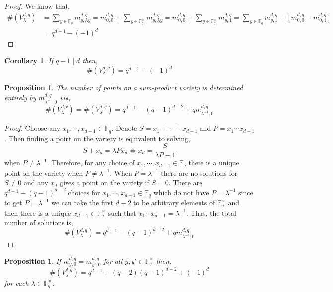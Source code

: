 \documentclass{article}
\newcommand{\finfield}[1]{\mathbb{F}_{#1}}
\newcommand{\finunits}[1]{\mathbb{F}_{#1}^\times}
\newcommand{\divides}{\mid}
\newtheorem{corollary}{Corollary}[theorem]
\newtheorem{proposition}[theorem]{Proposition}
\theoremstyle{definition}
\theoremstyle{definition}
\theoremstyle{remark}
\begin{document}
\begin{proof}
We know that,
\begin{align*}
\#(V^{d,q}_{\lambda}) & = \sum_{y \in \finfield{q}} m^{d,q}_{y, \lambda y} = m^{d,q}_{0,0} + \sum_{y \in \finunits{q}} m^{d,q}_{y, \lambda y} = m^{d,q}_{0,0} + \sum_{y \in \finunits{q}} m^{d,q}_{y, 1} = \sum_{y \in \finfield{q}} m^{d,q}_{y, 1} + [m^{d,q}_{0,0} - m^{d,q}_{0,1}]
\\
& = q^{d-1} - (-1)^d
\end{align*}
\end{proof}

\begin{corollary}
If $q - 1 \divides d$ then,
\[ \#(V^{d,q}_{\lambda}) = q^{d-1} - (-1)^d \]
\end{corollary}

\begin{proposition}
The number of points on a sum-product variety is determined entirely by $m^{d,q}_{\lambda^{-1}, 0}$ via,
\[ \#(V^{d,q}_{\lambda}) = \#(V^{d,q}_{\lambda}) = q^{d-1} - (q-1)^{d-2} + q m^{d,q}_{\lambda^{-1}, 0} \]
\end{proposition}

\begin{proof} \label{prop:points_sum_product_V}
Choose any $x_1, \cdots, x_{d-1} \in \finfield{q}$. Denote $S = x_1 + \cdots + x_{d-1}$ and $P = x_1 \cdots x_{d-1}$. Then finding a point on the variety is equivalent to solving,
\[ S + x_d = \lambda P x_d \iff x_d = \frac{S}{\lambda P - 1} \]
when $P \neq \lambda^{-1}$. Therefore, for any choice of $x_1, \cdots, x_{d-1} \in \finfield{q}$ there is a unique point on the variety when $P \neq \lambda^{-1}$. When $P = \lambda^{-1}$ there are no solutions for $S \neq 0$ and any $x_d$ gives a point on the variety if $S = 0$. There are $q^{d-1} - (q-1)^{d-2}$ choices for $x_1, \cdots, x_{d-1} \in \finfield{q}$ which do not have $P = \lambda^{-1}$ since to get $P = \lambda^{-1}$ we can take the first $d-2$ to be arbitrary elements of $\finunits{q}$ and then there is a unique $x_{d-1} \in \finunits{q}$ such that $x_1 \cdots x_{d-1} = \lambda^{-1}$. Thus, the total number of solutions is,
\[ \#(V^{d,q}_{\lambda}) = q^{d-1} - (q-1)^{d-2} + q m^{d,q}_{\lambda^{-1}, 0} \]
\end{proof}


\begin{proposition}
If $m^{d,q}_{y, 0} = m^{d,q}_{y', 0}$ for all $y, y' \in \finunits{q}$ then,
\[ \#(V^{d,q}_{\lambda}) = q^{d-1} + (q-2) (q-1)^{d-2} + (-1)^d \]
for each $\lambda \in \finunits{q}$.
\end{proposition}
\end{document}
